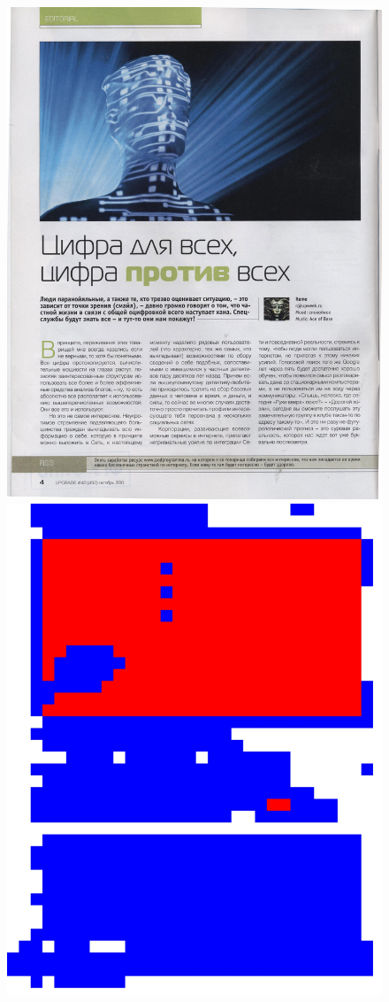 \documentclass{book}
\begin{document}
\begin{figure}[H]
\begin{center}
\includegraphics[scale=0.06]{images/rect_1.jpg}
\includegraphics[scale=0.06]{images/rect_1_res_hog_hsv_kmeans.jpg}

\end{center}
\end{figure}
\end{document}
